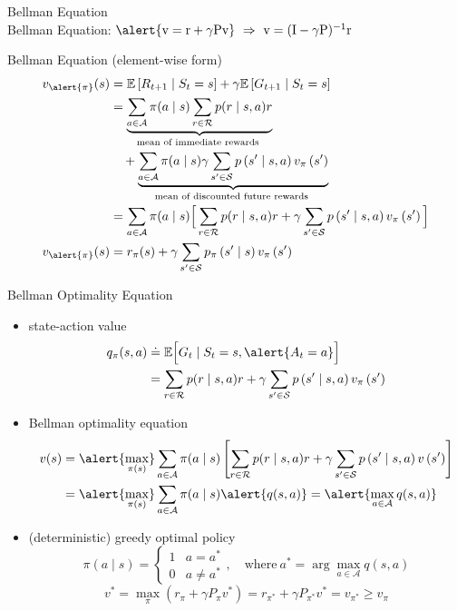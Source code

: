 \documentclass[UTF8, 10pt]{beamer}
\begin{document}
\begin{CJK*}{UTF8}{gbsn}
\begin{frame}{Bellman Equation}
$$	$$
	Bellman Equation:
	$\alert{\mathrm{v}=\mathrm{r}+\gamma \mathrm{P} \mathrm{v}}\ \Rightarrow \ \mathrm{v}=(\mathrm{I}-\gamma \mathrm{P})^{-1} \mathrm{r}$
\end{frame}
\begin{frame}{Bellman Equation (element-wise form)}
	$$
	\begin{aligned}
	 v_{\alert{\pi}}(s) & =\mathbb{E}\left[R_{t+1} \mid S_{t}=s\right]+\gamma \mathbb{E}\left[G_{t+1} \mid S_{t}=s\right] 
	\\ & =\underbrace{\sum_{a \in \mathcal{A}} \pi(a \mid s) \sum_{r \in \mathcal{R}} p(r \mid s, a) r}_{\text {mean of immediate rewards }}
	\\ &\quad +\underbrace{\sum_{a \in \mathcal{A}} \pi(a \mid s) \gamma\sum_{s^{\prime} \in \mathcal{S}} p\left(s^{\prime} \mid s, a\right) v_{\pi}\left(s^{\prime}\right)}_{\text {mean of discounted future rewards }} 
	\\ & =\sum_{a \in \mathcal{A}} \pi(a \mid s)\Big[\sum_{r \in \mathcal{R}} p(r \mid s, a) r+\gamma \sum_{s^{\prime} \in \mathcal{S}} p\left(s^{\prime} \mid s, a\right) v_{\pi}\left(s^{\prime}\right)\Big]
	\\
	v_{\alert{\pi}}(s)
	&=r_{\pi}(s)+\gamma \sum_{s^{\prime} \in \mathcal{S}} p_{\pi}\left(s^{\prime} \mid s\right) v_{\pi}\left(s^{\prime}\right)
	\end{aligned}
	$$
\end{frame}
\begin{frame}{Bellman Optimality Equation}
	\begin{itemize}
		\item state-action value
			$$
			\begin{aligned}
			q_{\pi}(s, a) &\doteq \mathbb{E}\Big[G_{t} \mid S_{t}=s, \alert{A_{t}=a}\Big]
			\\
			&=\sum_{r \in \mathcal{R}} p(r \mid s, a) r+\gamma \sum_{s^{\prime} \in \mathcal{S}} p\left(s^{\prime} \mid s, a\right) v_{\pi}\left(s^{\prime}\right)
			\end{aligned}
			$$
		\item Bellman optimality equation
			$$
			\begin{aligned} 
			v(s) & =\alert{\max _{\pi(s)}} \sum_{a \in \mathcal{A}} \pi(a \mid s)\left[\sum_{r \in \mathcal{R}} p(r \mid s, a) r+\gamma \sum_{s^{\prime} \in \mathcal{S}} p\left(s^{\prime} \mid s, a\right) v\left(s^{\prime}\right)\right] 
			\\ & =\alert{\max _{\pi(s)}} \sum_{a \in \mathcal{A}} \pi(a \mid s) \alert{q(s, a)}
			=\alert{\max_{a \in \mathcal{A}} q(s, a)}
			\end{aligned}
			$$
		\item (deterministic) greedy optimal policy
			$$
			\pi(a \mid s)=\left\{\begin{array}{ll}1 & a=a^{*} \\ 0 & a \neq a^{*}\end{array}\right.,\quad\text{where}\ a^*=\arg\max_{a\in \mathcal{A}} q(s,a)
			$$
			$$
			v^{*}=\max_{\pi}(r_\pi+\gamma P_\pi v^*)=r_{\pi^{*}}+\gamma P_{\pi^{*}} v^{*} = v_{\pi^*}\geq v_\pi
			$$
	\end{itemize}
\end{frame}


\end{CJK*}
\end{document}
